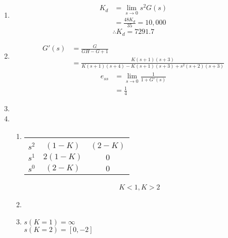 \documentclass[main.tex]{subfile}
\begin{document}
\begin{enumerate}
	\item 
		\begin{align*}
			K_d &= \lim_{s \to 0} s^2G(s) 
			\\  &= \frac{48K_d}{35} = 10,000
		\end{align*}
		\begin{displaymath}
			\therefore \boxed{K_d = 7291.7}
		\end{displaymath}

	\item
		\begin{align*}
			G'(s) &= \frac{G}{GH-G+1}
			\\    &= \frac{K(s+1)(s+3)}{K(s+1)(s+4)-K(s+1)(s+3)+s^2(s+2)(s+3)}
		\end{align*}
		\begin{align*}
			e_{ss} &= \lim_{s \to 0} \frac{1}{1+ G'(s)}
			\\     &= \frac{1}{4}
		\end{align*}

	\item
		

	\item
		\begin{enumerate}
			\item 
				\begin{tabular}{l|cc}
					\\\hline
					\\$s^2$ & $(1-K)$ & $(2-K)$
					\\$s^1$ & $2(1-K)$ & $0$
					\\$s^0$ & $(2-K)$  & $0$
				\end{tabular}
				\begin{align*}
					\boxed{K<1, K >2}
				\end{align*}
			\item
				
			\item 
				$s(K=1) = \infty$
				\\$s(K=2) = [0,-2]$
		\end{enumerate}
\end{enumerate}
\end{document}
